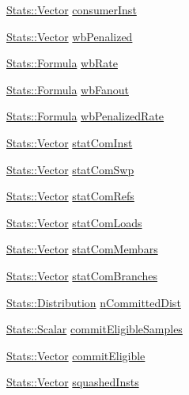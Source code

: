 \begin{DoxyCompactItemize}
\item 
\hyperlink{classStats_1_1Vector}{Stats::Vector} \hyperlink{classLWBackEnd_a69b21b8b0360b93b3088bbf183fe6abf}{consumerInst}
\item 
\hyperlink{classStats_1_1Vector}{Stats::Vector} \hyperlink{classLWBackEnd_a364daa8f3a358e41aa13fac115bb5e0f}{wbPenalized}
\item 
\hyperlink{classStats_1_1Formula}{Stats::Formula} \hyperlink{classLWBackEnd_a5ab2bb9fa8eb98a735a204082a37c9db}{wbRate}
\item 
\hyperlink{classStats_1_1Formula}{Stats::Formula} \hyperlink{classLWBackEnd_a667246d811337454bc9ceccf8bbf8f1c}{wbFanout}
\item 
\hyperlink{classStats_1_1Formula}{Stats::Formula} \hyperlink{classLWBackEnd_a58a4cd085d39435e69bc1ee729422d84}{wbPenalizedRate}
\item 
\hyperlink{classStats_1_1Vector}{Stats::Vector} \hyperlink{classLWBackEnd_a17e218fe16ffffa3f596551115cf1592}{statComInst}
\item 
\hyperlink{classStats_1_1Vector}{Stats::Vector} \hyperlink{classLWBackEnd_a4cb385aa97530dd2621c74f376839e79}{statComSwp}
\item 
\hyperlink{classStats_1_1Vector}{Stats::Vector} \hyperlink{classLWBackEnd_afe174c4b8e70d840a2e91bf1ca3092ac}{statComRefs}
\item 
\hyperlink{classStats_1_1Vector}{Stats::Vector} \hyperlink{classLWBackEnd_a91927819864b9dc9d1ac706dc55d5dce}{statComLoads}
\item 
\hyperlink{classStats_1_1Vector}{Stats::Vector} \hyperlink{classLWBackEnd_a9b029ac182d54199247dfa90ed86d368}{statComMembars}
\item 
\hyperlink{classStats_1_1Vector}{Stats::Vector} \hyperlink{classLWBackEnd_a39a7da0b20d1e83ccfe4b2f2b19d6e94}{statComBranches}
\item 
\hyperlink{classStats_1_1Distribution}{Stats::Distribution} \hyperlink{classLWBackEnd_a95950b28aceca73a1f17427dd767552d}{nCommittedDist}
\item 
\hyperlink{classStats_1_1Scalar}{Stats::Scalar} \hyperlink{classLWBackEnd_a16d1a4bbb2cb87488fd876fbf6e7a518}{commitEligibleSamples}
\item 
\hyperlink{classStats_1_1Vector}{Stats::Vector} \hyperlink{classLWBackEnd_a26f5138543e43cbaba9459036fc0b04c}{commitEligible}
\item 
\hyperlink{classStats_1_1Vector}{Stats::Vector} \hyperlink{classLWBackEnd_ab27e4267b3c35957215c1c88c2d6462a}{squashedInsts}
\item 

\end{DoxyCompactItemize}
